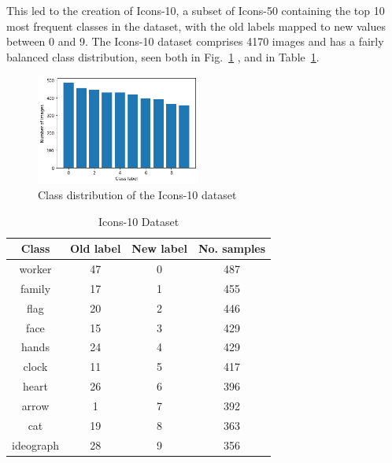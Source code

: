 This led to the creation of Icons-10, a subset of Icons-50 containing the top 10 most frequent classes in the dataset, with the old labels mapped to new values between 0 and 9.
The Icons-10 dataset comprises 4170 images and has a fairly balanced class distribution, seen both in Fig.~\ref{fig:Icons10ClassDist} , and in Table~\ref{tab:Icons10Desc}.

\begin{figure}[htbp]
    \centering
    \includegraphics[width=0.48\textwidth]{images/icons10/class_dist}
    \caption{Class distribution of the Icons-10 dataset}
    \label{fig:Icons10ClassDist}
\end{figure}

\begin{table}[htbp]
    \centering
    \caption{Icons-10 Dataset}
    \begin{tabular}{cccc}
        \hline
        \textbf{Class} & \textbf{Old label} & \textbf{New label} & \textbf{No. samples} \\ \hline
        worker         & 47                 & 0                  & 487                  \\
        family         & 17                 & 1                  & 455                  \\
        flag           & 20                 & 2                  & 446                  \\
        face           & 15                 & 3                  & 429                  \\
        hands          & 24                 & 4                  & 429                  \\
        clock          & 11                 & 5                  & 417                  \\
        heart          & 26                 & 6                  & 396                  \\
        arrow          & 1                  & 7                  & 392                  \\
        cat            & 19                 & 8                  & 363                  \\
        ideograph      & 28                 & 9                  & 356                  \\ \hline
    \end{tabular}
    \label{tab:Icons10Desc}
\end{table}

